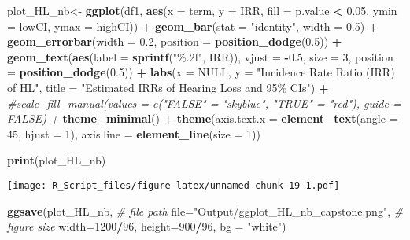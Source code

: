 \documentclass[
]{article}
\newenvironment{Shaded}{\begin{snugshade}}{\end{snugshade}}
\newcommand{\AttributeTok}[1]{\textcolor[rgb]{0.13,0.29,0.53}{#1}}
\newcommand{\CommentTok}[1]{\textcolor[rgb]{0.56,0.35,0.01}{\textit{#1}}}
\newcommand{\ConstantTok}[1]{\textcolor[rgb]{0.56,0.35,0.01}{#1}}
\newcommand{\DecValTok}[1]{\textcolor[rgb]{0.00,0.00,0.81}{#1}}
\newcommand{\FloatTok}[1]{\textcolor[rgb]{0.00,0.00,0.81}{#1}}
\newcommand{\FunctionTok}[1]{\textcolor[rgb]{0.13,0.29,0.53}{\textbf{#1}}}
\newcommand{\NormalTok}[1]{#1}
\newcommand{\OtherTok}[1]{\textcolor[rgb]{0.56,0.35,0.01}{#1}}
\newcommand{\SpecialCharTok}[1]{\textcolor[rgb]{0.81,0.36,0.00}{\textbf{#1}}}
\newcommand{\StringTok}[1]{\textcolor[rgb]{0.31,0.60,0.02}{#1}}
\begin{document}
\begin{Shaded}
\begin{Highlighting}[]
\NormalTok{plot\_HL\_nb}\OtherTok{\textless{}{-}} \FunctionTok{ggplot}\NormalTok{(df1, }\FunctionTok{aes}\NormalTok{(}\AttributeTok{x =}\NormalTok{ term, }\AttributeTok{y =}\NormalTok{ IRR, }\AttributeTok{fill =}\NormalTok{ p.value }\SpecialCharTok{\textless{}} \FloatTok{0.05}\NormalTok{, }\AttributeTok{ymin =}\NormalTok{ lowCI, }\AttributeTok{ymax =}\NormalTok{ highCI)) }\SpecialCharTok{+}
  \FunctionTok{geom\_bar}\NormalTok{(}\AttributeTok{stat =} \StringTok{"identity"}\NormalTok{, }\AttributeTok{width =} \FloatTok{0.5}\NormalTok{) }\SpecialCharTok{+}
  \FunctionTok{geom\_errorbar}\NormalTok{(}\AttributeTok{width =} \FloatTok{0.2}\NormalTok{, }\AttributeTok{position =} \FunctionTok{position\_dodge}\NormalTok{(}\FloatTok{0.5}\NormalTok{)) }\SpecialCharTok{+}
  \FunctionTok{geom\_text}\NormalTok{(}\FunctionTok{aes}\NormalTok{(}\AttributeTok{label =} \FunctionTok{sprintf}\NormalTok{(}\StringTok{"\%.2f"}\NormalTok{, IRR)), }\AttributeTok{vjust =} \SpecialCharTok{{-}}\FloatTok{0.5}\NormalTok{, }\AttributeTok{size =} \DecValTok{3}\NormalTok{, }\AttributeTok{position =} \FunctionTok{position\_dodge}\NormalTok{(}\FloatTok{0.5}\NormalTok{)) }\SpecialCharTok{+}
  \FunctionTok{labs}\NormalTok{(}\AttributeTok{x =} \ConstantTok{NULL}\NormalTok{, }\AttributeTok{y =} \StringTok{"Incidence Rate Ratio (IRR) of HL"}\NormalTok{, }\AttributeTok{title =} \StringTok{"Estimated IRRs of Hearing Loss and 95\% CIs"}\NormalTok{) }\SpecialCharTok{+}
  \CommentTok{\#scale\_fill\_manual(values = c("FALSE" = "skyblue", "TRUE" = "red"), guide = FALSE) +}
  \FunctionTok{theme\_minimal}\NormalTok{() }\SpecialCharTok{+}
  \FunctionTok{theme}\NormalTok{(}\AttributeTok{axis.text.x =} \FunctionTok{element\_text}\NormalTok{(}\AttributeTok{angle =} \DecValTok{45}\NormalTok{, }\AttributeTok{hjust =} \DecValTok{1}\NormalTok{),}
        \AttributeTok{axis.line =} \FunctionTok{element\_line}\NormalTok{(}\AttributeTok{size =} \DecValTok{1}\NormalTok{))}

\FunctionTok{print}\NormalTok{(plot\_HL\_nb)}
\end{Highlighting}
\end{Shaded}

\texttt{[image: R\_Script\_files/figure-latex/unnamed-chunk-19-1.pdf]}

\begin{Shaded}
\begin{Highlighting}[]
\FunctionTok{ggsave}\NormalTok{(plot\_HL\_nb,}
       \CommentTok{\# file path}
       \AttributeTok{file=}\StringTok{"Output/ggplot\_HL\_nb\_capstone.png"}\NormalTok{,}
       \CommentTok{\# figure size}
       \AttributeTok{width=}\DecValTok{1200}\SpecialCharTok{/}\DecValTok{96}\NormalTok{,}
       \AttributeTok{height=}\DecValTok{900}\SpecialCharTok{/}\DecValTok{96}\NormalTok{,}
       \AttributeTok{bg =} \StringTok{"white"}\NormalTok{)}
\end{Highlighting}
\end{Shaded}
\end{document}
